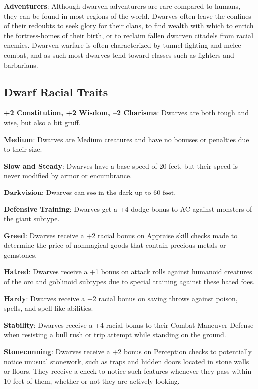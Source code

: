 \textbf{Adventurers}: Although dwarven adventurers are rare compared to humans, they can be found in most regions of the world. Dwarves often leave the confines of their redoubts to seek glory for their clans, to find wealth with which to enrich the fortress-homes of their birth, or to reclaim fallen dwarven citadels from racial enemies. Dwarven warfare is often characterized by tunnel fighting and melee combat, and as such most dwarves tend toward classes such as fighters and barbarians. 
											
\subsection{Dwarf Racial Traits}

				
\textbf{+2 Constitution, +2 Wisdom, --2 Charisma}: Dwarves are both tough and wise, but also a bit gruff.
				
\textbf{Medium}: Dwarves are Medium creatures and have no bonuses or penalties due to their size.
				
\textbf{Slow and Steady}: Dwarves have a base speed of 20 feet, but their speed is never modified by armor or encumbrance.
				
\textbf{Darkvision}: Dwarves can see in the dark up to 60 feet.
				
\textbf{Defensive Training}: Dwarves get a +4 dodge bonus to AC against monsters of the giant subtype. 
				
\textbf{Greed}: Dwarves receive a +2 racial bonus on Appraise skill checks made to determine the price of nonmagical goods that contain precious metals or gemstones.
				
\textbf{Hatred}: Dwarves receive a +1 bonus on attack rolls against humanoid creatures of the orc and goblinoid subtypes due to special training against these hated foes.
				
\textbf{Hardy}: Dwarves receive a +2 racial bonus on saving throws against poison, spells, and spell-like abilities.
				
\textbf{Stability}: Dwarves receive a +4 racial bonus to their Combat Maneuver Defense when resisting a bull rush or trip attempt while standing on the ground.
				
\textbf{Stonecunning}: Dwarves receive a +2 bonus on Perception checks to potentially notice unusual stonework, such as traps and hidden doors located in stone walls or floors. They receive a check to notice such features whenever they pass within 10 feet of them, whether or not they are actively looking. 
				
